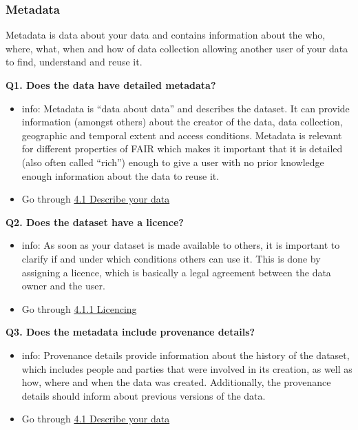 \documentclass[
  oneside]{book}
\providecommand{\tightlist}{%
  \setlength{\itemsep}{0pt}\setlength{\parskip}{0pt}}
\begin{document}
\subsubsection*{Metadata}\label{metadata-1}

Metadata is data about your data and contains information about the who, where, what, when and how of data collection allowing another user of your data to find, understand and reuse it.

\textbf{Q1. Does the data have detailed metadata?}

\begin{itemize}
\tightlist
\item
  info: Metadata is ``data about data'' and describes the dataset. It can provide information (amongst others) about the creator of the data, data collection, geographic and temporal extent and access conditions. Metadata is relevant for different properties of FAIR which makes it important that it is detailed (also often called ``rich'') enough to give a user with no prior knowledge enough information about the data to reuse it.\\
\item
  Go through \hyperref[describe-data]{4.1 Describe your data}
\end{itemize}

\textbf{Q2. Does the dataset have a licence?}

\begin{itemize}
\tightlist
\item
  info: As soon as your dataset is made available to others, it is important to clarify if and under which conditions others can use it. This is done by assigning a licence, which is basically a legal agreement between the data owner and the user.
\item
  Go through \hyperref[licencing]{4.1.1 Licencing}
\end{itemize}

\textbf{Q3. Does the metadata include provenance details?}

\begin{itemize}
\tightlist
\item
  info: Provenance details provide information about the history of the dataset, which includes people and parties that were involved in its creation, as well as how, where and when the data was created. Additionally, the provenance details should inform about previous versions of the data.
\item
  Go through \hyperref[describe-data]{4.1 Describe your data}
\end{itemize}
\end{document}
